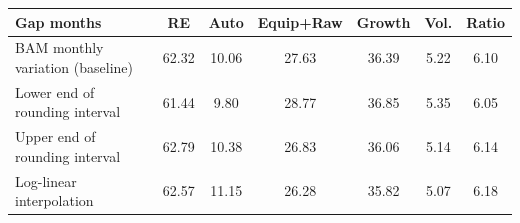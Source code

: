 \begin{tabular}{lcccccc}
\toprule
\textbf{Gap months} & RE & Auto & Equip+Raw & Growth & Vol. & Ratio \\
\midrule
BAM monthly variation (baseline) & 62.32 & 10.06 & 27.63 & 36.39 & 5.22 & 6.10 \\
Lower end of rounding interval & 61.44 & 9.80 & 28.77 & 36.85 & 5.35 & 6.05 \\
Upper end of rounding interval & 62.79 & 10.38 & 26.83 & 36.06 & 5.14 & 6.14 \\
Log-linear interpolation & 62.57 & 11.15 & 26.28 & 35.82 & 5.07 & 6.18 \\
\bottomrule
\end{tabular}
